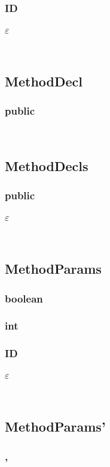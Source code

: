 \documentclass{report}
\begin{document}
\begin{multicols}{3}
\subsubsection*{ID}
\subsubsection*{$\varepsilon$}
\ 

\subsection*{MethodDecl}
\subsubsection*{public}
\ 

\subsection*{MethodDecls}
\subsubsection*{public}
\subsubsection*{$\varepsilon$}
\ 

\subsection*{MethodParams}
\subsubsection*{boolean}
\subsubsection*{int}
\subsubsection*{ID}
\subsubsection*{$\varepsilon$}
\ 

\subsection*{MethodParams'}
\subsubsection*{,}

\end{multicols}
\end{document}

